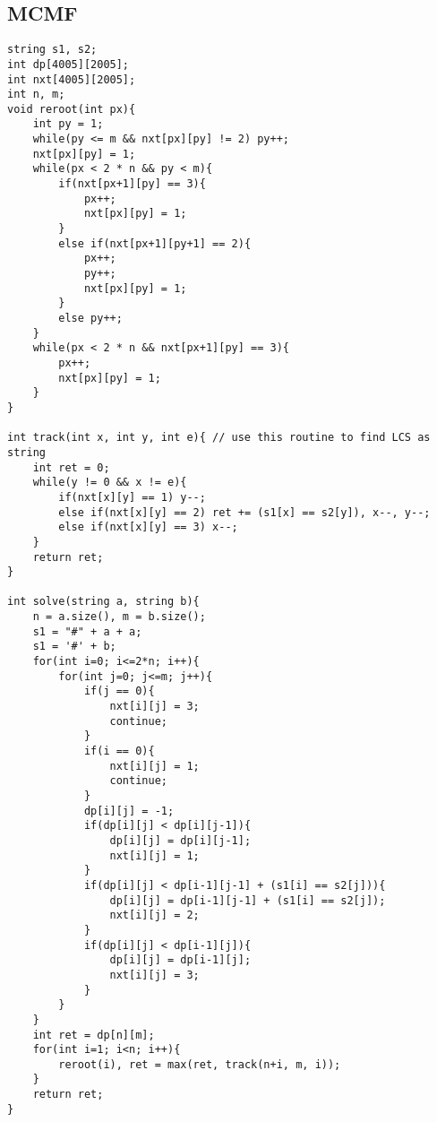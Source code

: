 \documentclass[landscape, 8pt, a4paper, oneside, twocolumn]{extarticle}
\begin{document}
\subsection{MCMF}
\begin{verbatim}
string s1, s2;
int dp[4005][2005];
int nxt[4005][2005];
int n, m;
void reroot(int px){
	int py = 1;
	while(py <= m && nxt[px][py] != 2) py++;
	nxt[px][py] = 1;
	while(px < 2 * n && py < m){
		if(nxt[px+1][py] == 3){
			px++;
			nxt[px][py] = 1;
		}
		else if(nxt[px+1][py+1] == 2){
			px++;
			py++;
			nxt[px][py] = 1;
		}
		else py++;
	}
	while(px < 2 * n && nxt[px+1][py] == 3){
		px++;
		nxt[px][py] = 1;
	}
}

int track(int x, int y, int e){ // use this routine to find LCS as string
	int ret = 0;
	while(y != 0 && x != e){
		if(nxt[x][y] == 1) y--;
		else if(nxt[x][y] == 2) ret += (s1[x] == s2[y]), x--, y--;
		else if(nxt[x][y] == 3) x--;
	}
	return ret;
}

int solve(string a, string b){
	n = a.size(), m = b.size();
	s1 = "#" + a + a;
	s1 = '#' + b;
	for(int i=0; i<=2*n; i++){
		for(int j=0; j<=m; j++){
			if(j == 0){
				nxt[i][j] = 3;
				continue;
			}
			if(i == 0){
				nxt[i][j] = 1;
				continue;
			}
			dp[i][j] = -1;
			if(dp[i][j] < dp[i][j-1]){
				dp[i][j] = dp[i][j-1];
				nxt[i][j] = 1;
			}
			if(dp[i][j] < dp[i-1][j-1] + (s1[i] == s2[j])){
				dp[i][j] = dp[i-1][j-1] + (s1[i] == s2[j]);
				nxt[i][j] = 2;
			}
			if(dp[i][j] < dp[i-1][j]){
				dp[i][j] = dp[i-1][j];
				nxt[i][j] = 3;
			}
		}
	}
	int ret = dp[n][m];
	for(int i=1; i<n; i++){
		reroot(i), ret = max(ret, track(n+i, m, i));
	}
	return ret;
}
\end{verbatim}
\end{document}
